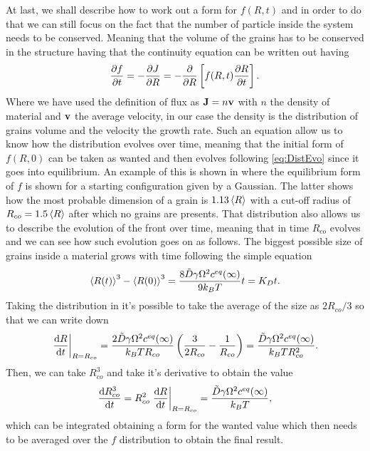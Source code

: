 At last, we shall describe how to work out a form for $f(R, t)$ and in order to do that we can still focus on the fact that the number of particle inside the system needs to be conserved. Meaning that the volume of the grains has to be conserved in the structure having that the continuity equation can be written out having
\begin{equation}
    \label{eq:DistEvo}
    \pdv{f}{t} = -\pdv{J}{R} = -\pdv{}{R}\left[ f(R,t)\pdv{R}{t} \right].
\end{equation}
Where we have used the definition of flux as $\vb{J} = n\vb{v}$ with $n$ the density of material and $\vb{v}$ the average velocity, in our case the density is the distribution of grains volume and the velocity the growth rate. Such an equation allow us to know how the distribution evolves over time, meaning that the initial form of $f(R, 0)$ can be taken as wanted and then evolves following \eqref{eq:DistEvo} since it goes into equilibrium. An example of this is shown in  where the equilibrium form of $f$ is shown for a starting configuration given by a Gaussian. The latter shows how the most probable dimension of a grain is $1.13\left\langle R \right\rangle$ with a cut-off radius of $R_{co} = 1.5\left\langle R \right\rangle$ after which no grains are presents. That distribution also allows us to describe the evolution of the front over time, meaning that in time $R_{co}$ evolves and we can see how such evolution goes on as follows.
{
    The biggest possible size of grains inside a material grows with time following the simple equation
    \begin{equation}
        \label{eq:cutoffGrowth}
        \left\langle R(t) \right\rangle^3 - \left\langle R(0) \right\rangle^3 = \frac{8\tilde{D}\gamma\Omega^2c^{eq}(\infty)}{9k_BT}t = K_Dt.
    \end{equation}
}
{
    Taking the distribution in  it's possible to take the average of the size as $2R_{co}/3$ so that we can write down
    \begin{equation}
        \eval{\dv{R}{t}}_{R=R_{co}} = \frac{2\tilde{D}\gamma\Omega^2c^{eq}(\infty)}{k_BTR_{co}}\left( \frac{3}{2R_{co}} - \frac{1}{R_{co}} \right) = \frac{\tilde{D}\gamma\Omega^2c^{eq}(\infty)}{k_BTR_{co}^2}.
    \end{equation}
    Then, we can take $R_{co}^3$ and take it's derivative to obtain the value
    \begin{equation}
        \dv{R_{co}^3}{t} = R^2_{co} \eval{\dv{R}{t}}_{R=R_{co}} = \frac{\tilde{D}\gamma\Omega^2c^{eq}(\infty)}{k_BT},
    \end{equation} 
    which can be integrated obtaining a form for the wanted value which then needs to be averaged over the $f$ distribution to obtain the final result.
}
